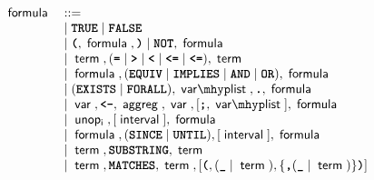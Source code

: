 \begin{figure}
	\[
		\begin{array}{ll}
			\ebnfr{formula}        & ::=                                                                                                                                                                           \\
			                       & \mid \ebnft{TRUE} \mid \ebnft{FALSE}                                                                                                                                          \\
			                       & \mid \ebnft{(}, \ebnfr{formula}, \ebnft{)} \mid \ebnft{NOT}, \ebnfr{formula}                                                                                                  \\
			                       & \mid \ebnfr{term}, (\ebnft{=} \mid \ebnft{>} \mid \ebnft{<} \mid \ebnft{<=} \mid \ebnft{<=}), \ebnfr{term}                                                                    \\
			                       & \mid \ebnfr{formula}, (\ebnft{EQUIV} \mid \ebnft{IMPLIES} \mid \ebnft{AND} \mid \ebnft{OR}), \ebnfr{formula}                                                                  \\
			                       & \mid (\ebnft{EXISTS} \mid \ebnft{FORALL}), \ebnfr{var \mhyp list}, \ebnft{.}, \ebnfr{formula}                                                                                 \\
			                       & \mid \ebnfr{var}, \ebnft{<-}, \ebnfr{aggreg}, \ebnfr{var}, [\ebnft{;}, \ebnfr{var \mhyp list}], \ebnfr{formula}                                                               \\
			                       & \mid \ebnfr{unop_i}, [\ebnfr{interval}], \ebnfr{formula}                                                                                                                      \\
			                       & \mid \ebnfr{formula}, (\ebnft{SINCE} \mid \ebnft{UNTIL}), [\ebnfr{interval}], \ebnfr{formula}                                                                                 \\
			                       & \mid \ebnfr{term}, \ebnft{SUBSTRING}, \ebnfr{term}                                                                                                                            \\
			                       & \mid \ebnfr{term}, \ebnft{MATCHES}, \ebnfr{term}, [ \ebnft{(}, ( \ebnft{\_} \mid \ebnfr{term} ), \{ \ebnft{,} (\ebnft{\_} \mid \ebnfr{term}) \} \ebnft{)} ]                   \\

\end{array}\]
\end{figure}
